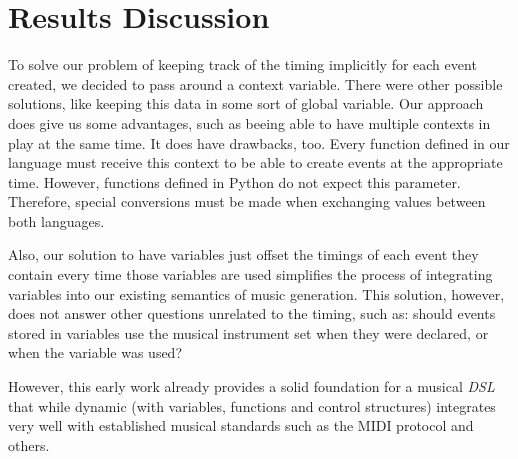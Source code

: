 \documentclass[a4paper,UKenglish,cleveref, autoref]{oasics-v2019}
\begin{document}
\section{Results Discussion}
\label{sec:conclusions}

To solve our problem of keeping track of the timing implicitly for each event created, we decided to pass around a context variable. There were other possible solutions, like keeping this data in some sort of global variable. Our approach does give us some advantages, such as beeing able to have multiple contexts in play at the same time. It does have drawbacks, too. Every function defined in our language must receive this context to be able to create events at the appropriate time. However, functions defined in Python do not expect this parameter. Therefore, special conversions must be made when exchanging values between both languages.

Also, our solution to have variables just offset the timings of each event they contain every time those variables are used simplifies the process of integrating variables into our existing semantics of music generation. This solution, however, does not answer other questions unrelated to the timing, such as: should events stored in variables use the musical instrument set when they were declared, or when the variable was used?

However, this early work already provides a solid foundation for a musical \textit{DSL} that while dynamic (with variables, functions and control structures) integrates very well with established musical standards such as the MIDI protocol and others.



\end{document}

